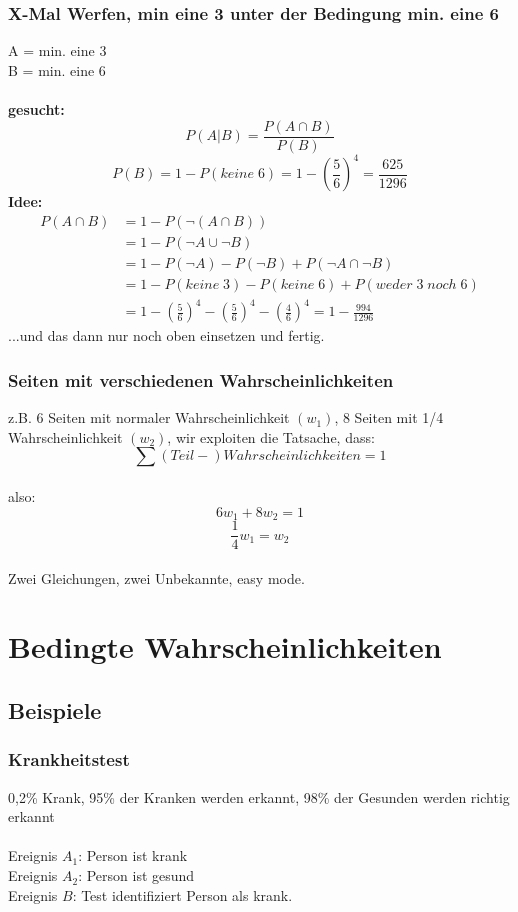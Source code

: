 \documentclass{article}
\begin{document}
\subsubsection{X-Mal Werfen, min eine 3 unter der Bedingung min. eine 6}
	A = min. eine 3 \\
	B = min. eine 6 \\\\
	\textbf{gesucht:} \[P(A|B) = \frac{P(A\cap B)}{P(B)} \]
	\[P(B) = 1-P(keine\;6) = 1-\left(\frac{5}{6}\right)^4 = \frac{625}{1296}\]
	\textbf{Idee:}
		\begin{align*}
			P(A\cap B) 	&= 1-P(\neg (A\cap B))\\
						&= 1-P(\neg A \cup \neg B)\\
						&= 1-P(\neg A) - P(\neg B) + P(\neg A \cap \neg B)\\
						&= 1-P(keine\;3)-P(keine\;6)+P(weder\;3\;noch\;6)\\
						&= 1-\left( \frac{5}{6}\right)^4-\left( \frac{5}{6}\right)^4-\left( \frac{4}{6}\right)^4 = 1- \frac{994}{1296}
		\end{align*}	
...und das dann nur noch oben einsetzen und fertig.

\subsubsection{Seiten mit verschiedenen Wahrscheinlichkeiten}
z.B. 6 Seiten mit normaler Wahrscheinlichkeit $(w_1)$, 8 Seiten mit 1/4 Wahrscheinlichkeit
$(w_2)$, wir exploiten die Tatsache, dass: \\ \[ \sum
(Teil-)Wahrscheinlichkeiten = 1 \]\\
also:\\
\begin{equation}	
6w_1 + 8w_2 = 1 \end{equation}
\begin{equation}	
	\frac{1}{4}w_1 = w_2 
\end{equation}\\
Zwei Gleichungen, zwei Unbekannte, easy mode.

\section{Bedingte Wahrscheinlichkeiten}
\subsection{Beispiele}
\subsubsection{Krankheitstest}
0,2\% Krank, 95\% der Kranken werden erkannt, 98\% der Gesunden werden richtig erkannt\\ \\
Ereignis $A_1$: Person ist krank\\
Ereignis $A_2$: Person ist gesund\\
Ereignis $B$: Test identifiziert Person als krank.\\
\end{document}

